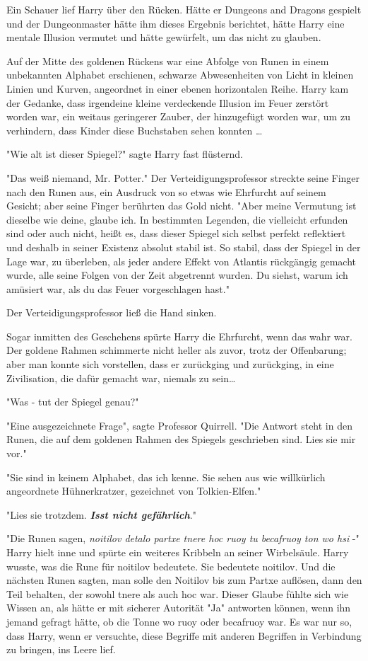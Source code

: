{Ein Schauer lief Harry über den Rücken. Hätte er Dungeons and Dragons gespielt und der Dungeonmaster hätte ihm dieses Ergebnis berichtet, hätte Harry eine mentale Illusion vermutet und hätte gewürfelt, um das nicht zu glauben.

Auf der Mitte des goldenen Rückens war eine Abfolge von Runen in einem unbekannten Alphabet erschienen, schwarze Abwesenheiten von Licht in kleinen Linien und Kurven, angeordnet in einer ebenen horizontalen Reihe. Harry kam der Gedanke, dass irgendeine kleine verdeckende Illusion im Feuer zerstört worden war, ein weitaus geringerer Zauber, der hinzugefügt worden war, um zu verhindern, dass Kinder diese Buchstaben sehen konnten …

"Wie alt ist dieser Spiegel?" sagte Harry fast flüsternd.

"Das weiß niemand, Mr. Potter." Der Verteidigungsprofessor streckte seine Finger nach den Runen aus, ein Ausdruck von so etwas wie Ehrfurcht auf seinem Gesicht; aber seine Finger berührten das Gold nicht. "Aber meine Vermutung ist dieselbe wie deine, glaube ich. In bestimmten Legenden, die vielleicht erfunden sind oder auch nicht, heißt es, dass dieser Spiegel sich selbst perfekt reflektiert und deshalb in seiner Existenz absolut stabil ist. So stabil, dass der Spiegel in der Lage war, zu überleben, als jeder andere Effekt von Atlantis rückgängig gemacht wurde, alle seine Folgen von der Zeit abgetrennt wurden. Du siehst, warum ich amüsiert war, als du das Feuer vorgeschlagen hast."

Der Verteidigungsprofessor ließ die Hand sinken.

Sogar inmitten des Geschehens spürte Harry die Ehrfurcht, wenn das wahr war. Der goldene Rahmen schimmerte nicht heller als zuvor, trotz der Offenbarung; aber man konnte sich vorstellen, dass er zurückging und zurückging, in eine Zivilisation, die dafür gemacht war, niemals zu sein…

"Was - tut der Spiegel genau?"

"Eine ausgezeichnete Frage", sagte Professor Quirrell. "Die Antwort steht in den Runen, die auf dem goldenen Rahmen des Spiegels geschrieben sind. Lies sie mir vor."

"Sie sind in keinem Alphabet, das ich kenne. Sie sehen aus wie willkürlich angeordnete Hühnerkratzer, gezeichnet von Tolkien-Elfen."

"Lies sie trotzdem. \textbf{\emph{Isst nicht gefährlich}}."

"Die Runen sagen, \emph{noitilov detalo partxe tnere hoc ruoy tu becafruoy ton wo hsi} -" Harry hielt inne und spürte ein weiteres Kribbeln an seiner Wirbelsäule. Harry wusste, was die Rune für noitilov bedeutete. Sie bedeutete noitilov. Und die nächsten Runen sagten, man solle den Noitilov bis zum Partxe auflösen, dann den Teil behalten, der sowohl tnere als auch hoc war. Dieser Glaube fühlte sich wie Wissen an, als hätte er mit sicherer Autorität "Ja" antworten können, wenn ihn jemand gefragt hätte, ob die Tonne wo ruoy oder becafruoy war. Es war nur so, dass Harry, wenn er versuchte, diese Begriffe mit anderen Begriffen in Verbindung zu bringen, ins Leere lief.

}

